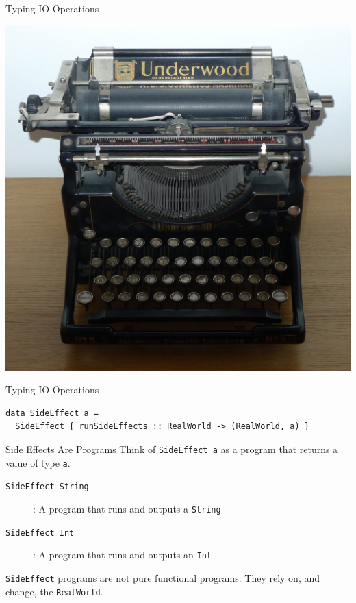 \documentclass[10pt, presentation, colorlinks]{beamer}
\begin{document}
\begin{frame}[label={sec:orgeda50f5}]{Typing IO Operations}
\begin{center}
\includegraphics[height=0.4\textheight]{./img/typewriter.JPG}
\end{center}
\end{frame}

\begin{frame}[label={sec:org0b1e226},fragile]{Typing IO Operations}
 \begin{verbatim}
data SideEffect a =
  SideEffect { runSideEffects :: RealWorld -> (RealWorld, a) }
\end{verbatim}
\end{frame}

\begin{frame}[label={sec:org5389a3c},fragile]{Side Effects Are Programs}
 Think of \texttt{SideEffect a} as a \alert{program} that returns a value of type
\texttt{a}.

\bigskip

\begin{description}
\item[{\texttt{SideEffect String}}] : A program that runs and outputs a \texttt{String}
\item[{\texttt{SideEffect Int}}] : A program that runs and outputs an \texttt{Int}
\end{description}

\bigskip

\texttt{SideEffect} programs are not pure functional programs. They rely on, and change, the \texttt{RealWorld}.
\end{frame}
\end{document}
